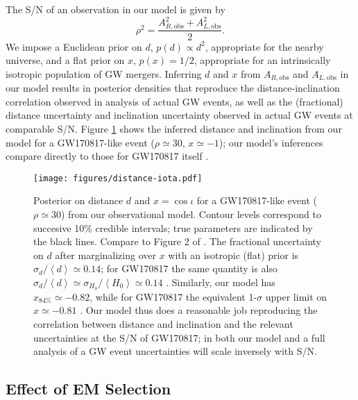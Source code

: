 \documentclass[modern]{aastex631}
\newcommand{\obs}{\mathrm{obs}}
\begin{document}
The S/N of an observation in our model is given by 
\begin{equation}
    \rho^2 = \frac{A_{R,\obs}^2 + A_{L,\obs}^2}{2}.
\end{equation}
We impose a Euclidean prior on $d$, $p(d) \propto d^2$, appropriate for the
nearby universe, and a flat prior on $x$, $p(x) = 1/2$, appropriate for an
intrinsically isotropic population of GW mergers.  Inferring $d$ and $x$ from
$A_{R,\obs}$ and $A_{L,\obs}$ in our model results in posterior densities that
reproduce the distance-inclination correlation observed in analysis of actual GW
events, as well as the (fractional) distance uncertainty and inclination
uncertainty observed in actual GW events at comparable S/N.  Figure
\ref{fig:distance-iota} shows the inferred distance and inclination from our
model for a GW170817-like event ($\rho \simeq 30$, $x \simeq -1$); our model's
inferences compare directly to those for GW170817 itself \citep{Abbott2017}.

\begin{figure}
    \texttt{[image: figures/distance-iota.pdf]}
    \caption{Posterior on distance $d$ and $x = \cos \iota$ for a GW170817-like
    event ($\rho \simeq 30$) from our observational model.  Contour levels
    correspond to succesive 10\% credible intervals; true parameters are
    indicated by the black lines.  Compare to Figure 2 of \citet{Abbott2017}.
    The fractional uncertainty on $d$ after marginalizing over $x$ with an
    isotropic (flat) prior is $\sigma_d / \left\langle d \right\rangle \simeq
    0.14$; for GW170817 the same quantity is also $\sigma_d / \left\langle d
    \right\rangle \simeq \sigma_{H_0} / \left\langle H_0 \right\rangle \simeq
    0.14$ \citep{Abbott2017}.  Similarly, our model has $x_{84\%} \simeq -0.82$,
    while for GW170817 the equivalent 1-$\sigma$ upper limit on $x \simeq -0.81$
    \citep{Abbott2017}.  Our model thus does a reasonable job reproducing the
    correlation between distance and inclination and the relevant uncertainties
    at the S/N of GW170817; in both our model and a full analysis of a GW event
    uncertainties will scale inversely with S/N.}
    \label{fig:distance-iota}
\end{figure}

\subsection{Effect of EM Selection}
\end{document}
